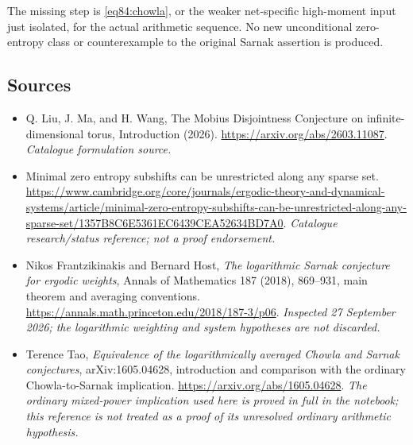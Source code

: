 \documentclass[11pt,a4paper]{article}
\numberwithin{equation}{section}
\begin{document}
The missing step is \eqref{eq84:chowla}, or the weaker net-specific
high-moment input just isolated, for the actual arithmetic sequence.
No new unconditional zero-entropy class or counterexample to the original
Sarnak assertion is produced.

\needspace{170mm}
\subsection{Sources}
\begin{itemize}\raggedright
\item[\textnormal{[S1]}]\hypertarget{source:statement:1}{} Q. Liu, J. Ma, and H. Wang, The Mobius Disjointness Conjecture on infinite-dimensional torus, Introduction (2026).
\url{https://arxiv.org/abs/2603.11087}.
{\small\textit{Catalogue formulation source.}}
\item[\textnormal{[S2]}]\hypertarget{source:statement:2}{} Minimal zero entropy subshifts can be unrestricted along any sparse set.
\url{https://www.cambridge.org/core/journals/ergodic-theory-and-dynamical-systems/article/minimal-zero-entropy-subshifts-can-be-unrestricted-along-any-sparse-set/1357B8C6E5361EC6439CEA52634BD7A0}.
{\small\textit{Catalogue research/status reference; not a proof endorsement.}}
\item[\textnormal{[E1]}]\hypertarget{extra:statement:1}{} Nikos Frantzikinakis
and Bernard Host, \emph{The logarithmic Sarnak conjecture for ergodic weights},
Annals of Mathematics 187 (2018), 869--931, main theorem and averaging
conventions.
\url{https://annals.math.princeton.edu/2018/187-3/p06}.
{\small\textit{Inspected 27 September 2026; the logarithmic weighting and
system hypotheses are not discarded.}}
\item[\textnormal{[E2]}]\hypertarget{extra:statement:2}{} Terence Tao,
\emph{Equivalence of the logarithmically averaged Chowla and Sarnak
conjectures}, arXiv:1605.04628, introduction and comparison with the
ordinary Chowla-to-Sarnak implication.
\url{https://arxiv.org/abs/1605.04628}.
{\small\textit{The ordinary mixed-power implication used here is proved
in full in the notebook; this reference is not treated as a proof of its
unresolved ordinary arithmetic hypothesis.}}
\end{itemize}
\end{document}
